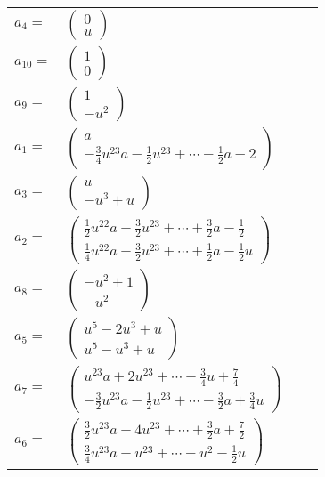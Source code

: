 \documentclass[1p]{elsarticle_modified}
\theoremstyle{definition}
\begin{document}
\begin{tabular}{m{7pt} m{180pt} m{7pt} m{180pt} }
\flushright $a_{4}=$&$\begin{pmatrix}0\\u\end{pmatrix}$ \\
\flushright $a_{10}=$&$\begin{pmatrix}1\\0\end{pmatrix}$ \\
\flushright $a_{9}=$&$\begin{pmatrix}1\\- u^2\end{pmatrix}$ \\
\flushright $a_{1}=$&$\begin{pmatrix}a\\-\frac{3}{4} u^{23} a-\frac{1}{2} u^{23}+\cdots-\frac{1}{2} a-2\end{pmatrix}$ \\
\flushright $a_{3}=$&$\begin{pmatrix}u\\- u^3+u\end{pmatrix}$ \\
\flushright $a_{2}=$&$\begin{pmatrix}\frac{1}{2} u^{22} a-\frac{3}{2} u^{23}+\cdots+\frac{3}{2} a-\frac{1}{2}\\\frac{1}{4} u^{22} a+\frac{3}{2} u^{23}+\cdots+\frac{1}{2} a-\frac{1}{2} u\end{pmatrix}$ \\
\flushright $a_{8}=$&$\begin{pmatrix}- u^2+1\\- u^2\end{pmatrix}$ \\
\flushright $a_{5}=$&$\begin{pmatrix}u^5-2 u^3+u\\u^5- u^3+u\end{pmatrix}$ \\
\flushright $a_{7}=$&$\begin{pmatrix}u^{23} a+2 u^{23}+\cdots-\frac{3}{4} u+\frac{7}{4}\\-\frac{3}{2} u^{23} a-\frac{1}{2} u^{23}+\cdots-\frac{3}{2} a+\frac{3}{4} u\end{pmatrix}$ \\
\flushright $a_{6}=$&$\begin{pmatrix}\frac{3}{2} u^{23} a+4 u^{23}+\cdots+\frac{3}{2} a+\frac{7}{2}\\\frac{3}{4} u^{23} a+u^{23}+\cdots- u^2-\frac{1}{2} u\end{pmatrix}$ \\

\end{tabular}
\end{document}

